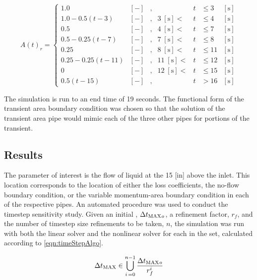 \begin{equation}
\label{eqn:valveTransLoss}
A(t)_{r} = \left\{
\begin{array}{cclrcll}
 1.0 & [-] & , & & t & \leq 3 & [\text{s}] \\
 1.0 - 0.5 \left( t - 3\right) & [-] & , & 3\; [\text{s}] < & t & \leq 4 & [\text{s}] \\
 0.5 & [-] & , & 4\; [\text{s}] < & t & \leq 7 & [\text{s}] \\
 0.5 - 0.25 \left( t - 7\right) & [-] & , &  7\; [\text{s}] < & t & \leq 8 & [\text{s}] \\
 0.25 & [-] & , & 8\; [\text{s}] < & t & \leq 11 & [\text{s}] \\
 0.25 - 0.25 \left( t - 11\right) & [-] & , & 11\; [\text{s}] < & t & \leq 12 & [\text{s}] \\
 0 & [-] & , & 12\; [\text{s}] < & t & \leq 15 & [\text{s}] \\
 0.5 \left( t - 15\right) & [-] & , & & t & > 16 & [\text{s}]
\end{array}\right.
\end{equation}

The simulation is run to an end time of 19 seconds.
The functional form of the transient area boundary condition was chosen so that the solution of the transient area pipe would mimic each of the three other pipes for portions of the transient.

\subsection{Results}
\label{subsect:valveResults}

The parameter of interest is the flow of liquid at the 15 [in] above the inlet.
This location corresponds to the location of either the loss coefficients, the no-flow boundary condition, or the variable momentum-area boundary condition in each of the respective pipes.
An automated procedure was used to conduct the timestep sensitivity study.
Given an initial \dtmax{}, $\dtmax{}_{o}$, a refinement factor, $r_{f}$, and the number of timestep size refinements to be taken, $n$, the simulation was run with both the linear solver and the nonlinear solver for each \dtmax{} in the set, calculated according to \eqref{eqn:timeStepAlgo}.

\begin{equation}
\label{eqn:timeStepAlgo}
\dtmax{} \in \bigcup^{n-1}_{i\, = 0} \frac{\dtmax{}_{o}}{r^{i}_{f}}
\end{equation}

